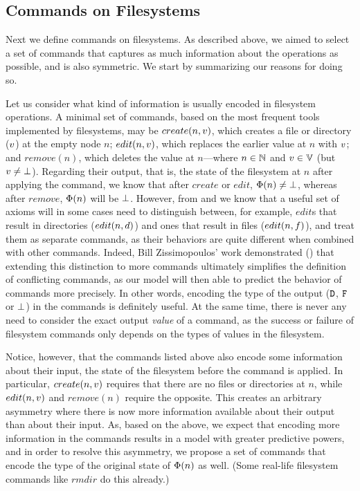 
\subsection{Commands on Filesystems}


Next we define commands on filesystems.
As described above, we aimed to select a set of commands
that captures as much information
about the operations as possible, and is also symmetric.
We start by summarizing our reasons for doing so.

Let us consider what kind of information is usually encoded in filesystem operations.
A minimal set of commands, based on the most frequent tools implemented by filesystems,
may be $create(n,v)$, which creates a file or directory ($v$) at the empty node $n$;
$edit(n,v)$, which replaces the earlier value at $n$ with $v$;
and $remove(n)$, which deletes the value at $n$---where 
$n\in\mathbb{N}$ and $v\in\mathbb{V}$ (but $v\neq\bot$).
Regarding their output, that is, the state of the filesystem at $n$
after applying the command,
we know that after $create$ or $edit$, $\Phi(n)\neq\bot$, whereas after $remove$,
$\Phi(n)$ will be $\bot$. 
However, from \cite{NREC} and \cite{CBNR} we know that a useful set of axioms
will in some cases need to distinguish between, for example,
$edit$s that result in directories ($edit(n,d)$) and
ones that result in files ($edit(n,f)$), and treat them as separate commands,
as their behaviors are quite different when combined with other commands.
Indeed, Bill Zissimopoulos' work
demonstrated (\cite{BZ})
that extending this distinction to more commands ultimately simplifies
the definition of conflicting commands, as our model will then able to predict the behavior of commands
more precisely.
In other words, encoding the type of the output ($\mathtt{D}$, $\mathtt{F}$ or $\bot$) in the commands is definitely useful.
At the same time, there is never any need to consider the
exact output \emph{value} of a command,
as the success or failure of filesystem commands only depends on the types of values in the filesystem.

Notice, however, that the commands listed above also encode some information about 
their input, the state of the filesystem
before the command is applied. In particular, $create(n,v)$ requires that there are no files
or directories at $n$, while $edit(n,v)$ and $remove(n)$ require the opposite.
This creates an arbitrary asymmetry where
there is now more information available about their output than about their input.
As, based on the above, we expect that encoding more information in the commands
results in a model with greater predictive powers,
and in order to resolve this asymmetry, 
we propose a set of commands that encode
the type of the original state of $\Phi(n)$ as well.
(Some real-life filesystem commands like $rmdir$ do this already.)

